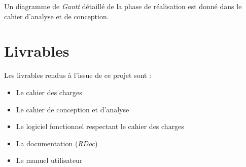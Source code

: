 \documentclass[a4paper, 12pt]{report}
\begin{document}
		Un diagramme de \textit{Gantt} détaillé de la phase de réalisation est donné dans le cahier d'analyse et de conception.

		
\chapter{Livrables}
\vspace*{0.5cm}
	Les livrables rendus à l'issue de ce projet sont :
	\begin{itemize}
	\item Le cahier des charges
	\item Le cahier de conception et d'analyse
	\item Le logiciel fonctionnel respectant le cahier des charges
	\item La documentation (\textit{RDoc})
	\item Le manuel utilisateur
	\end{itemize}
		
		
		
\end{document}
